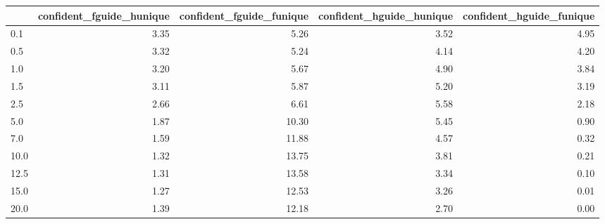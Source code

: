 \begin{tabular}{lrrrr}
\toprule
 & confident_fguide_hunique & confident_fguide_funique & confident_hguide_hunique & confident_hguide_funique \\
\midrule
0.1 & 3.35 & 5.26 & 3.52 & 4.95 \\
0.5 & 3.32 & 5.24 & 4.14 & 4.20 \\
1.0 & 3.20 & 5.67 & 4.90 & 3.84 \\
1.5 & 3.11 & 5.87 & 5.20 & 3.19 \\
2.5 & 2.66 & 6.61 & 5.58 & 2.18 \\
5.0 & 1.87 & 10.30 & 5.45 & 0.90 \\
7.0 & 1.59 & 11.88 & 4.57 & 0.32 \\
10.0 & 1.32 & 13.75 & 3.81 & 0.21 \\
12.5 & 1.31 & 13.58 & 3.34 & 0.10 \\
15.0 & 1.27 & 12.53 & 3.26 & 0.01 \\
20.0 & 1.39 & 12.18 & 2.70 & 0.00 \\
\bottomrule
\end{tabular}
